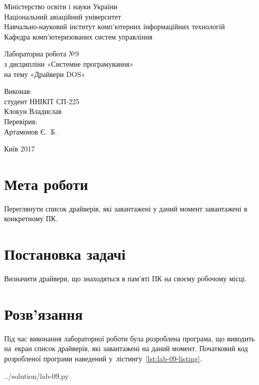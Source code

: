 \documentclass[a4paper,oneside,DIV=12,12pt]{scrartcl}
\begin{document}
	\begin{titlepage}
	\centering
		Міністерство освіти і науки України\\
		Національний авіаційний університет\\
		Навчально-науковий інститут комп'ютерних інформаційних технологій\\
		Кафедра комп'ютеризованих систем управління

		\vspace{\fill}

		Лабораторна робота №9\\
		з дисципліни «Системне програмування»\\
		на тему «Драйвери DOS»

		\vspace{\fill}
		
		\begin{flushright}
			Виконав:\\
			студент ННІКІТ СП-225\\
			Клокун Владислав\\
			Перевірив:\\
			Артамонов Є.~Б.
		\end{flushright}

		Київ 2017
    \end{titlepage}
	
	\section{Мета роботи}
		Переглянути список драйверів, які завантажені у даний момент завантажені в конкретному ПК.
		
	\section{Постановка задачі}
		Визначити драйвери, що знаходяться в пам'яті ПК на своєму робочому місці. 
		
	\section{Розв'язання}
		Під час виконання лабораторної роботи була розроблена програма, що виводить на~екран список драйверів, які завантажені на даний момент. Початковий код розробленої програми наведений у~лістингу~\ref{lst:lab-09-listing}.
		
		
		{../solution/lab-09.py}
	
\end{document}
